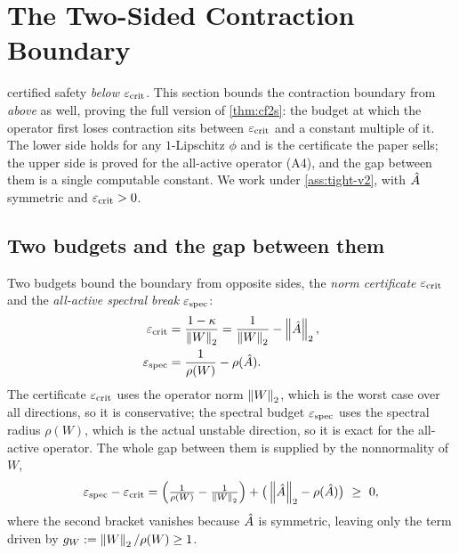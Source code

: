 \section{The Two-Sided Contraction Boundary}
\label{app:bracket}

 certified safety \emph{below} $\varepsilon_{\mathrm{crit}}$. This section bounds the contraction
boundary from \emph{above} as well, proving the full version of \cref{thm:cf2s}: the budget at which
the operator first loses contraction sits between $\varepsilon_{\mathrm{crit}}$ and a constant multiple of it. The lower
side holds for any $1$-Lipschitz $\phi$ and is the certificate the paper sells; the upper side is proved
for the all-active operator (A4), and the gap between them is a single computable constant. We work
under \cref{ass:tight-v2}, with $\hat{A}$ symmetric and $\varepsilon_{\mathrm{crit}}>0$.

\subsection{Two budgets and the gap between them}
\label{app:bracket-budgets}

Two budgets bound the boundary from opposite sides, the \emph{norm certificate} $\varepsilon_{\mathrm{crit}}$ and the
\emph{all-active spectral break} $\varepsilon_{\mathrm{spec}}$:
\begin{align}
\varepsilon_{\mathrm{crit}}&=\frac{1-\kappa}{\left\|W\right\|_2}=\frac{1}{\left\|W\right\|_2}-\left\|\hat{A}\right\|_2,\\
\varepsilon_{\mathrm{spec}}&=\frac{1}{\rho(W)}-\rho(\hat{A}).
\end{align}
The certificate $\varepsilon_{\mathrm{crit}}$ uses the operator norm $\left\|W\right\|_2$, which is the worst case over all
directions, so it is conservative; the spectral budget $\varepsilon_{\mathrm{spec}}$ uses the spectral radius $\rho(W)$,
which is the actual unstable direction, so it is exact for the all-active operator. The whole gap
between them is supplied by the nonnormality of $W$,
\begin{equation}
\espec-\ecrit=\Big(\tfrac{1}{\rho(W)}-\tfrac{1}{\norm{W}_2}\Big)+\big(\norm{\Ahat}_2-\rho(\Ahat)\big)\ \ge\ 0,
\label{eq:additive-gap}
\end{equation}
where the second bracket vanishes because $\hat{A}$ is symmetric, leaving only the term driven by
$g_W:=\left\|W\right\|_2/\rho(W)\ge1$.

